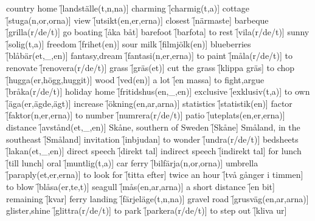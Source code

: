 \begin{questions}
    \begin{multicols}{2}
        \raggedcolumns
        \question country home \f[landställe(t,n,na)]
        \question charming \f[charmig(t,a)]
        \question cottage \f[stuga(n,or,orna)]
        \question view \f[utsikt(en,er,erna)]
        \question closest \f[närmaste]
        \question barbeque \f[grilla(r/de/t)]
        \question go boating \f[åka båt]
        \question barefoot \f[barfota]
        \question to rest \f[vila(r/de/t)]
        \question sunny \f[solig(t,a)]
        \question freedom \f[frihet(en)]
        \question sour milk \f[filmjölk(en)]
        \question blueberries \f[blåbär(et,\_,en)]
        \question fantasy,dream \f[fantasi(n,er,erna)]
        \question to paint \f[måla(r/de/t)]
        \question to renovate \f[renovera(r/de/t)]
        \question grass \f[gräs(et)]
        \question cut the grass \f[klippa gräs]
        \question to chop \f[hugga(er,högg,huggit)]
        \question wood \f[ved(en)]
        \question a lot \f[en massa]
        \question to fight,argue \f[bråka(r/de/t)]
        \question holiday home \f[fritidshus(en,\_,en)]
        \question exclusive \f[exklusiv(t,a)]
        \question to own \f[äga(er,ägde,ägt)]
        \question increase \f[ökning(en,ar,arna)]
        \question statistics \f[statistik(en)]
        \question factor \f[faktor(n,er,erna)]
        \question to number \f[numrera(r/de/t)]
        \question patio \f[uteplats(en,er,erna)]
        \question distance \f[avstånd(et,\_,en)]
        \question Skåne, southern of Sweden \f[Skåne]
        \question Småland, in the southeast \f[Småland]
        \question invitation \f[inbjudan]
        \question to wonder \f[undra(r/de/t)]
        \question bedsheets \f[lakan(et,\_,en)]
        \question direct speech \f[direkt tal]
        \question indirect speech \f[indirekt tal]
        \question for lunch \f[till lunch]
        \question oral \f[muntlig(t,a)]
        \question car ferry \f[bilfärja(n,or,orna)]
        \question umbrella \f[paraply(et,er,erna)]
        \question to look for \f[titta efter]
        \question twice an hour \f[två gånger i timmen]
        \question to blow \f[blåsa(er,te,t)]
        \question seagull \f[mås(en,ar,arna)]
        \question a short distance \f[en bit]
        \question remaining \f[kvar]
        \question ferry landing \f[färjeläge(t,n,na)]
        \question gravel road \f[grusväg(en,ar,arna)]
        \question glister,shine \f[glittra(r/de/t)]
        \question to park \f[parkera(r/de/t)]
        \question to step out \f[kliva ur]

\end{multicols}
\end{questions}
